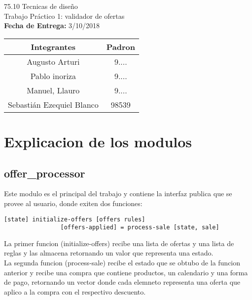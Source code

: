 \documentclass[a4paper, 12pt]{article}
\begin{document}
	\begin{titlepage}
		\vspace*{\fill}
		\begin{center}
			\Large 75.10 Tecnicas de diseño \\
			\Huge Trabajo Práctico 1: validador de ofertas \\
			\textbf{Fecha de Entrega:} 3/10/2018\\
			\bigskip
			\begin{center}
				\begin{tabular}{||c | c||} 
					\hline
					Integrantes & Padron \\ [0.5ex] 
					\hline\hline
					Augusto Arturi & 9.... \\
					\hline
					Pablo inoriza & 9.... \\
					\hline
					Manuel, Llauro & 9.... \\
					\hline
					Sebastián Ezequiel Blanco & 98539 \\
					\hline
				\end{tabular}
			\end{center}

		\end{center}
		\vspace*{\fill}
	\end{titlepage}
	\newpage

	\tableofcontents
	\newpage

	\section{Explicacion de los modulos}
		\subsection{offer\_processor}
			Este modulo es el principal del trabajo y contiene la interfaz publica que se provee al usuario, donde exiten dos 				funciones:\\
			\begin{lstlisting}[frame=tb, caption=firmas de la interfaz publica, label=zebra, tabsize=1]
				[state] initialize-offers [offers rules]
				[offers-applied] = process-sale [state, sale]
			\end{lstlisting}
			La primer funcion (initialize-offers) recibe una lista de ofertas y una lista de reglas y las almacena retornando un 				valor que representa una estado. \\
			La segunda funcion (process-sale) recibe el estado que se obtubo de la funcion anterior y recibe una compra que 			contiene productos, un calendario y una forma de pago, retornando un vector donde cada elemneto representa una oferta 				que aplico a la compra con el respectivo descuento.
		
\end{document}

